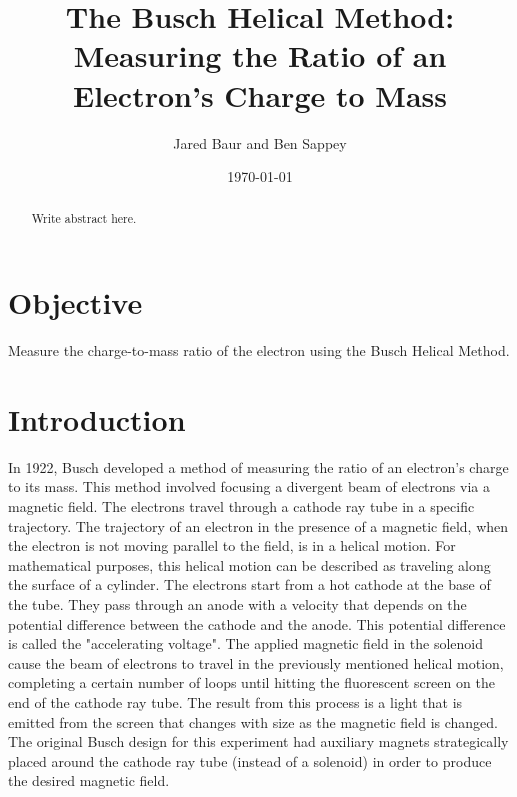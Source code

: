 \documentclass[%
 aip,
 amsmath,amssymb,
 reprint,%
floatfix,
]{revtex4-1}
\begin{document}

\title[]{The Busch Helical Method: \\ Measuring the Ratio of an Electron's Charge to Mass}

\author{Jared Baur and Ben Sappey}

\date{\today}%


\begin{abstract}

	Write abstract here.

\end{abstract}

\maketitle


\onecolumngrid

\section{\label{sec:level1}Objective}

	Measure the charge-to-mass ratio of the electron using the Busch Helical Method.

\section{\label{sec:level2}Introduction}

In 1922, Busch developed a method of measuring the ratio of an electron's charge to its mass. This method involved focusing a divergent beam of electrons via a magnetic field. The electrons travel through a cathode ray tube in a specific trajectory. The trajectory of an electron in the presence of a magnetic field, when the electron is not moving parallel to the field, is in a helical motion. For mathematical purposes, this helical motion can be described as traveling along the surface of a cylinder. The electrons start from a hot cathode at the base of the tube. They pass through an anode with a velocity that depends on the potential difference between the cathode and the anode. This potential difference is called the "accelerating voltage". The applied magnetic field in the solenoid cause the beam of electrons to travel in the previously mentioned helical motion, completing a certain number of loops until hitting the fluorescent screen on the end of the cathode ray tube. The result from this process is a light that is emitted from the screen that changes with size as the magnetic field is changed. The original Busch design for this experiment had auxiliary magnets strategically placed around the cathode ray tube (instead of a solenoid) in order to produce the desired magnetic field\cite{Stranathan1942}.
\end{document}
